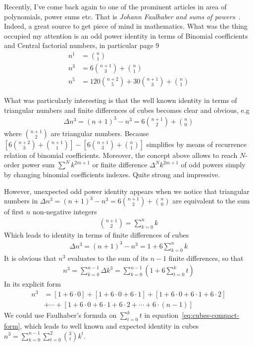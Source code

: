 Recently, I've come back again to one of the prominent articles in area of polynomials, power sums etc.
That is \textit{Johann Faulhaber and sums of powers}~\cite{knuth1993johann}.
Indeed, a great source to get piece of mind in mathematics.
What was the thing occupied my attention is an odd power identity in terms of Binomial coefficients and
Central factorial numbers, in particular page 9
\begin{align*}
    n^1 &= \binom{n}{1} \\
    n^3 &= 6 \binom{n+1}{3} + \binom{n}{1} \\
    n^5 &= 120 \binom{n+2}{5} + 30 \binom{n+1}{3} + \binom{n}{1}
\end{align*}

What was particularly interesting is that the well known identity in terms of triangular numbers
and finite differences of cubes becomes clear and obvious, e.g
\begin{align*}
    \Delta n^3 = (n+1)^3 - n^3
    =  6 \binom{n+1}{2} + \binom{n}{0}
\end{align*}
where $\binom{n+1}{2}$ are triangular numbers.
Because $\left[ 6 \binom{n+2}{3} + \binom{n+1}{1} \right] - \left[ 6 \binom{n+1}{3} + \binom{n}{1} \right]$
simplifies by means of recurrence relation of binomial coefficients.
Moreover, the concept above allows to reach $N$-order power sum $\sum^N k^{2m+1}$
or finite difference $\Delta^N k^{2m+1}$ of odd powers simply by changing
binomial coefficients indexes.
Quite strong and impressive.

However, unexpected odd power identity appears when we notice that triangular
numbers in $\Delta n^3 = (n+1)^3 - n^3 =  6 \binom{n+1}{2} + \binom{n}{0}$
are equivalent to the sum of first $n$ non-negative integers
\begin{align*}
    \binom{n+1}{2} = \sum_{k=0}^{n} k
\end{align*}
Which leads to identity in terms of finite differences of cubes
\begin{align*}
    \Delta n^3 = (n+1)^3 - n^3 = 1 + 6 \sum_{k=0}^{n} k
\end{align*}
It is obvious that $n^3$ evaluates to the sum of its $n-1$ finite differences, so that
\begin{align}
    \label{eq:cubes-compact-form}
    n^3 = \sum_{k=0}^{n-1} \Delta k^3 = \sum_{k=0}^{n-1} \left( 1 + 6 \sum_{t=0}^{k} t \right)
\end{align}
In its explicit form
\begin{align}
    \label{eq:cubes-explicit-form}
    n^3 &= [1+6\cdot0]+[1+6\cdot0+6\cdot1]+[1+6\cdot0+6\cdot1+6\cdot2] \\
    &+ \cdots + [1+6\cdot0+6\cdot1+6\cdot2+\cdots+6\cdot(n-1)] \nonumber
\end{align}
We could use Faulhaber's formula on $\sum_{t=0}^{k} t$ in equation~\eqref{eq:cubes-compact-form},
which leads to well known and expected identity in cubes $n^3 = \sum_{k=0}^{n-1} \sum_{t=0}^{2} \binom{3}{t} k^t$.

